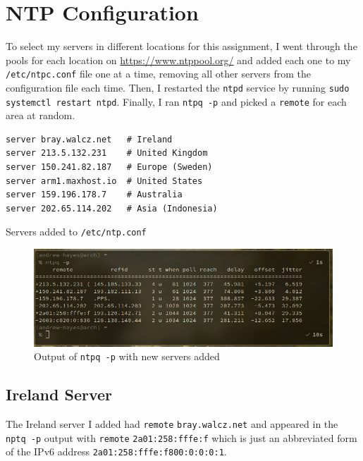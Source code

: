 \documentclass[a4paper]{article}
\newenvironment{code}{\captionsetup{type=listing}}{}
\begin{document}
\section{NTP Configuration}
To select my servers in different locations for this assignment, I went through the pools for each location on \url{https://www.ntppool.org/} and added each one to my \verb|/etc/ntpc.conf| file one at a time, removing all other servers from the configuration file each time.
Then, I restarted the \verb|ntpd| service by running \texttt{sudo systemctl restart ntpd}.
Finally, I ran \texttt{ntpq -p} and picked a \verb|remote| for each area at random.

\begin{code}
\begin{verbatim}
server bray.walcz.net   # Ireland
server 213.5.132.231    # United Kingdom
server 150.241.82.187   # Europe (Sweden)
server arm1.maxhost.io  # United States
server 159.196.178.7    # Australia
server 202.65.114.202   # Asia (Indonesia)
\end{verbatim}
\caption{Servers added to \texttt{/etc/ntp.conf}}
\end{code}

\begin{figure}[H]
    \centering
    \includegraphics[width=\textwidth]{./images/ntpqoutput.png}
    \caption{Output of \texttt{ntpq -p} with new servers added}
\end{figure}

\subsection{Ireland Server}
The Ireland server I added had \verb|remote| \verb|bray.walcz.net| and appeared in the \verb|nptq -p| output with \verb|remote| \verb|2a01:258:fffe:f| which is just an abbreviated form of the IPv6 address \verb|2a01:258:fffe:f800:0:0:0:1|.
\end{document}
